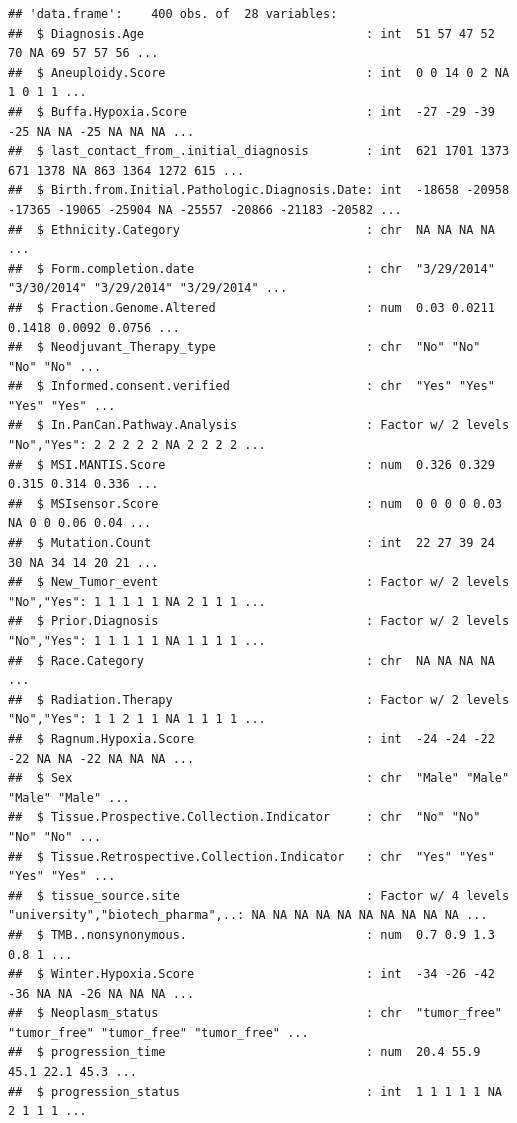\documentclass[
  11pt,
]{article}
\begin{document}
\begin{verbatim}
## 'data.frame':    400 obs. of  28 variables:
##  $ Diagnosis.Age                               : int  51 57 47 52 70 NA 69 57 57 56 ...
##  $ Aneuploidy.Score                            : int  0 0 14 0 2 NA 1 0 1 1 ...
##  $ Buffa.Hypoxia.Score                         : int  -27 -29 -39 -25 NA NA -25 NA NA NA ...
##  $ last_contact_from_.initial_diagnosis        : int  621 1701 1373 671 1378 NA 863 1364 1272 615 ...
##  $ Birth.from.Initial.Pathologic.Diagnosis.Date: int  -18658 -20958 -17365 -19065 -25904 NA -25557 -20866 -21183 -20582 ...
##  $ Ethnicity.Category                          : chr  NA NA NA NA ...
##  $ Form.completion.date                        : chr  "3/29/2014" "3/30/2014" "3/29/2014" "3/29/2014" ...
##  $ Fraction.Genome.Altered                     : num  0.03 0.0211 0.1418 0.0092 0.0756 ...
##  $ Neodjuvant_Therapy_type                     : chr  "No" "No" "No" "No" ...
##  $ Informed.consent.verified                   : chr  "Yes" "Yes" "Yes" "Yes" ...
##  $ In.PanCan.Pathway.Analysis                  : Factor w/ 2 levels "No","Yes": 2 2 2 2 2 NA 2 2 2 2 ...
##  $ MSI.MANTIS.Score                            : num  0.326 0.329 0.315 0.314 0.336 ...
##  $ MSIsensor.Score                             : num  0 0 0 0 0.03 NA 0 0 0.06 0.04 ...
##  $ Mutation.Count                              : int  22 27 39 24 30 NA 34 14 20 21 ...
##  $ New_Tumor_event                             : Factor w/ 2 levels "No","Yes": 1 1 1 1 1 NA 2 1 1 1 ...
##  $ Prior.Diagnosis                             : Factor w/ 2 levels "No","Yes": 1 1 1 1 1 NA 1 1 1 1 ...
##  $ Race.Category                               : chr  NA NA NA NA ...
##  $ Radiation.Therapy                           : Factor w/ 2 levels "No","Yes": 1 1 2 1 1 NA 1 1 1 1 ...
##  $ Ragnum.Hypoxia.Score                        : int  -24 -24 -22 -22 NA NA -22 NA NA NA ...
##  $ Sex                                         : chr  "Male" "Male" "Male" "Male" ...
##  $ Tissue.Prospective.Collection.Indicator     : chr  "No" "No" "No" "No" ...
##  $ Tissue.Retrospective.Collection.Indicator   : chr  "Yes" "Yes" "Yes" "Yes" ...
##  $ tissue_source.site                          : Factor w/ 4 levels "university","biotech_pharma",..: NA NA NA NA NA NA NA NA NA NA ...
##  $ TMB..nonsynonymous.                         : num  0.7 0.9 1.3 0.8 1 ...
##  $ Winter.Hypoxia.Score                        : int  -34 -26 -42 -36 NA NA -26 NA NA NA ...
##  $ Neoplasm_status                             : chr  "tumor_free" "tumor_free" "tumor_free" "tumor_free" ...
##  $ progression_time                            : num  20.4 55.9 45.1 22.1 45.3 ...
##  $ progression_status                          : int  1 1 1 1 1 NA 2 1 1 1 ...
\end{verbatim}
\end{document}
